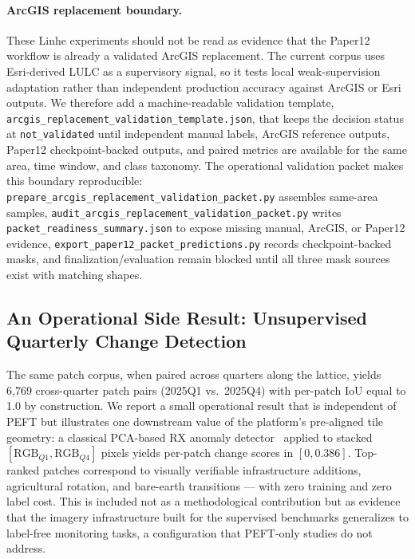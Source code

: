 \paragraph{ArcGIS replacement boundary.}
These Linhe experiments should not be read as evidence that the Paper12 workflow is already a validated ArcGIS replacement. The current corpus uses Esri-derived LULC as a supervisory signal, so it tests local weak-supervision adaptation rather than independent production accuracy against ArcGIS or Esri outputs. We therefore add a machine-readable validation template, \texttt{arcgis\_replacement\_validation\_template.json}, that keeps the decision status at \texttt{not\_validated} until independent manual labels, ArcGIS reference outputs, Paper12 checkpoint-backed outputs, and paired metrics are available for the same area, time window, and class taxonomy. The operational validation packet makes this boundary reproducible: \texttt{prepare\_arcgis\_replacement\_validation\_packet.py} assembles same-area samples, \texttt{audit\_arcgis\_replacement\_validation\_packet.py} writes \texttt{packet\_readiness\_summary.json} to expose missing manual, ArcGIS, or Paper12 evidence, \texttt{export\_paper12\_packet\_predictions.py} records checkpoint-backed masks, and finalization/evaluation remain blocked until all three mask sources exist with matching shapes.

\subsection{An Operational Side Result: Unsupervised Quarterly Change Detection}

The same patch corpus, when paired across quarters along the lattice, yields 6{,}769 cross-quarter patch pairs (2025Q1 vs.\ 2025Q4) with per-patch IoU equal to 1.0 by construction. We report a small operational result that is independent of PEFT but illustrates one downstream value of the platform's pre-aligned tile geometry: a classical PCA-based RX anomaly detector~\cite{reed1990rx} applied to stacked $[\text{RGB}_{Q1}, \text{RGB}_{Q4}]$ pixels yields per-patch change scores in $[0, 0.386]$. Top-ranked patches correspond to visually verifiable infrastructure additions, agricultural rotation, and bare-earth transitions --- with zero training and zero label cost. This is included not as a methodological contribution but as evidence that the imagery infrastructure built for the supervised benchmarks generalizes to label-free monitoring tasks, a configuration that PEFT-only studies do not address.

